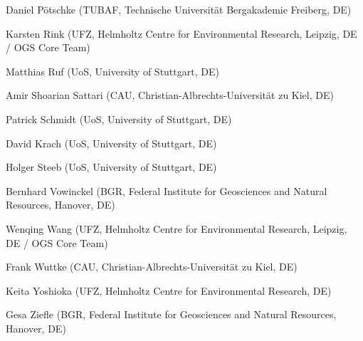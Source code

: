\begin{list}{-}{\leftmargin=1em \itemindent=0em \itemsep=0.1em}
\item Daniel P\"otschke (TUBAF, Technische Universit\"at Bergakademie Freiberg, DE)
\item Karsten Rink (UFZ, Helmholtz Centre for Environmental Research, Leipzig, DE / OGS Core Team) 
\item Matthias Ruf (UoS, University of Stuttgart, DE)
\item Amir Shoarian Sattari (CAU, Christian-Albrechts-Universität zu Kiel, DE)
\item Patrick Schmidt (UoS, University of Stuttgart, DE)	
\item David Krach (UoS, University of Stuttgart, DE)	
\item Holger Steeb (UoS, University of Stuttgart, DE)	
\item Bernhard Vowinckel (BGR, Federal Institute for Geosciences and Natural Resources, Hanover, DE)	\item Wenqing Wang (UFZ, Helmholtz Centre for Environmental Research, Leipzig, DE / OGS Core Team) 
\item Frank Wuttke (CAU, Christian-Albrechts-Universität zu Kiel, DE)	
\item Keita Yoshioka (UFZ, Helmholtz Centre for Environmental Research, DE) 
\item Gesa Ziefle (BGR, Federal Institute for Geosciences and Natural Resources, Hanover, DE)	
\end{list}